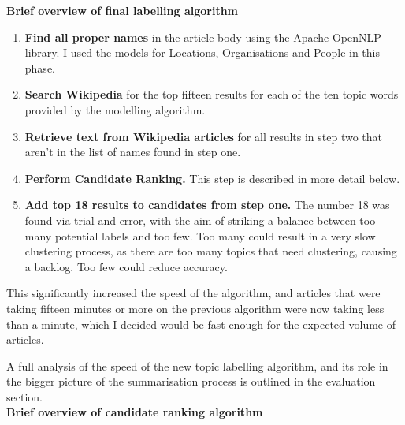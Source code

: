\documentclass[12pt]{article}
\begin{document}
\textbf{Brief overview of final labelling algorithm} \\

\begin{enumerate}
	\item \textbf{Find all proper names} in the article body using the Apache OpenNLP library. I used the models for Locations, Organisations and People in this phase. 
	\item \textbf{Search Wikipedia} for the top fifteen results for each of the ten topic words provided by the modelling algorithm. 
	\item \textbf{Retrieve text from Wikipedia articles} for all results in step two that aren't in the list of names found in step one. 
	\item \textbf{Perform Candidate Ranking.} This step is described in more detail below. 
	\item \textbf{Add top 18 results to candidates from step one.} The number 18 was found via trial and error, with the aim of striking a balance between too many potential labels and too few. Too many could result in a very slow clustering process, as there are too many topics that need clustering, causing a backlog. Too few could reduce accuracy. 
\end{enumerate}

This significantly increased the speed of the algorithm, and articles that were taking fifteen minutes or more on the previous algorithm were now taking less than a minute, which I decided would be fast enough for the expected volume of articles.

A full analysis of the speed of the new topic labelling algorithm, and its role in the bigger picture of the summarisation process is outlined in the evaluation section. \\

\textbf{Brief overview of candidate ranking algorithm} \\
\end{document}
